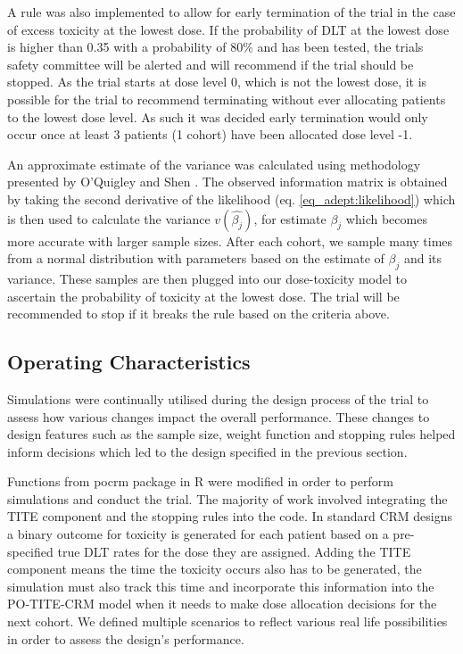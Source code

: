 A rule was also implemented to allow for early termination of the trial in the case of excess toxicity at the lowest dose. If the probability of DLT at the lowest dose is higher than 0.35 with a probability of 80\% and has been tested, the trials safety committee will be alerted and will recommend if the trial should be stopped. As the trial starts at dose level 0, which is not the lowest dose, it is possible for the trial to recommend terminating without ever allocating patients to the lowest dose level. As such it was decided early termination would only occur once at least 3 patients (1 cohort) have been allocated dose level -1. 

An approximate estimate of the variance was calculated using methodology presented by O'Quigley and Shen \cite{oquigleyContinualReassessmentMethod1996}. The observed information matrix is obtained by taking the second derivative of the likelihood (eq. \ref{eq_adept:likelihood}) which is then used to calculate the variance $v(\hat{\beta_j})$, for estimate $\beta_j$ which becomes more accurate with larger sample sizes. After each cohort, we sample many times from a normal distribution with parameters based on the estimate of $\beta_j$ and its variance. These samples are then plugged into our dose-toxicity model to ascertain the probability of toxicity at the lowest dose. The trial will be recommended to stop if it breaks the rule based on the criteria above. 


\subsection{Operating Characteristics}
\label{adept:OCs} 

Simulations were continually utilised during the design process of the trial to assess how various changes impact the overall performance. These changes to design features such as the sample size, weight function and stopping rules helped inform decisions which led to the design specified in the previous section.  

Functions from pocrm package in R \cite{wagesPocrmRpackagePhase2013, wagesPocrmDoseFinding2019} were modified in order to perform simulations and conduct the trial. The majority of work involved integrating the TITE component and the stopping rules into the code. In standard CRM designs a binary outcome for toxicity is generated for each patient based on a pre-specified true DLT rates for the dose they are assigned. Adding the TITE component means the time the toxicity occurs also has to be generated, the simulation must also track this time and incorporate this information into the PO-TITE-CRM model when it needs to make dose allocation decisions for the next cohort. We defined multiple scenarios to reflect various real life possibilities in order to assess the design's performance.  

